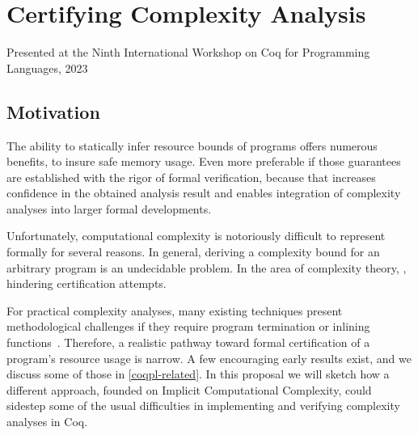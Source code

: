 \section*{Certifying Complexity Analysis}
\label{sec:certifying-complexity-analysis}

{Presented at the Ninth International Workshop on Coq for Programming Languages, 2023}

\begin{abstract}
This work drafts a strategy that leverages the field of Implicit Computational Complexity to certify resource usage in imperative programs.
This original approach sidesteps some of the most common--and difficult--obstacles \enquote{traditional} complexity theory face when implemented in Coq.
\end{abstract}\clearpage

\subsection{Motivation}

The ability to statically infer resource bounds of programs offers numerous benefits, \eg
to insure safe memory usage.
Even more preferable if those guarantees are established with the rigor of formal verification,
because that increases confidence in the obtained analysis result and enables integration of complexity
analyses into larger formal developments.

Unfortunately, computational complexity is notoriously difficult to represent formally for several reasons.
In general, deriving a complexity bound for an arbitrary program is an undecidable problem. %
In the area of complexity theory, , hindering certification attempts.

For practical complexity analyses, many existing techniques present methodological challenges if they require \eg program termination or inlining functions~\cite{carbonneaux2015}.
Therefore, a realistic pathway toward formal certification of a program's resource usage is narrow.
A few encouraging early results exist, and we discuss some of those in \autoref{coqpl-related}.
In this proposal we will sketch how a different approach, founded on Implicit Computational Complexity,
could sidestep some of the usual difficulties in implementing and verifying complexity analyses in Coq.


